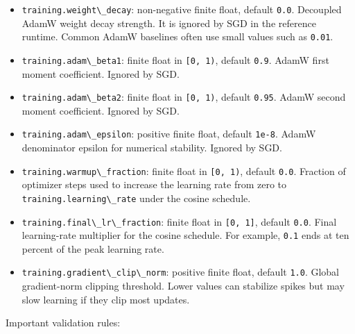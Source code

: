 \documentclass[
]{article}
\newcommand{\passthrough}[1]{#1}
\begin{document}
\begin{itemize}
  \passthrough{\lstinline!constant!} keeps the learning rate fixed at
  \passthrough{\lstinline!training.learning\_rate!}.
\item
  \passthrough{\lstinline!training.weight\_decay!}: non-negative finite
  float, default \passthrough{\lstinline!0.0!}. Decoupled AdamW weight
  decay strength. It is ignored by SGD in the reference runtime. Common
  AdamW baselines often use small values such as
  \passthrough{\lstinline!0.01!}.
\item
  \passthrough{\lstinline!training.adam\_beta1!}: finite float in
  \passthrough{\lstinline![0, 1)!}, default
  \passthrough{\lstinline!0.9!}. AdamW first moment coefficient. Ignored
  by SGD.
\item
  \passthrough{\lstinline!training.adam\_beta2!}: finite float in
  \passthrough{\lstinline![0, 1)!}, default
  \passthrough{\lstinline!0.95!}. AdamW second moment coefficient.
  Ignored by SGD.
\item
  \passthrough{\lstinline!training.adam\_epsilon!}: positive finite
  float, default \passthrough{\lstinline!1e-8!}. AdamW denominator
  epsilon for numerical stability. Ignored by SGD.
\item
  \passthrough{\lstinline!training.warmup\_fraction!}: finite float in
  \passthrough{\lstinline![0, 1)!}, default
  \passthrough{\lstinline!0.0!}. Fraction of optimizer steps used to
  increase the learning rate from zero to
  \passthrough{\lstinline!training.learning\_rate!} under the cosine
  schedule.
\item
  \passthrough{\lstinline!training.final\_lr\_fraction!}: finite float
  in \passthrough{\lstinline![0, 1]!}, default
  \passthrough{\lstinline!0.0!}. Final learning-rate multiplier for the
  cosine schedule. For example, \passthrough{\lstinline!0.1!} ends at
  ten percent of the peak learning rate.
\item
  \passthrough{\lstinline!training.gradient\_clip\_norm!}: positive
  finite float, default \passthrough{\lstinline!1.0!}. Global
  gradient-norm clipping threshold. Lower values can stabilize spikes
  but may slow learning if they clip most updates.
\end{itemize}

Important validation rules:
\end{document}
